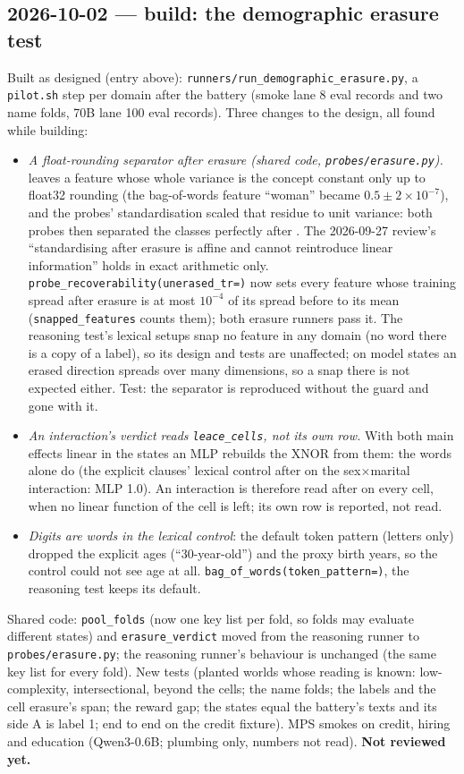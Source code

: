 \documentclass{article}
\begin{document}
\subsection*{2026-10-02 --- build: the demographic erasure test}
Built as designed (entry above): \texttt{runners/run\_demographic\_erasure.py}, a \texttt{pilot.sh} step per domain
after the battery (smoke lane 8 eval records and two name folds, 70B lane 100 eval records). Three changes to the
design, all found while building:
\begin{itemize}
  \item \emph{A float-rounding separator after erasure (shared code, \texttt{probes/erasure.py}).} \leace{} leaves a
        feature whose whole variance is the concept constant only up to float32 rounding (the bag-of-words feature
        ``woman'' became $0.5\pm2\times10^{-7}$), and the probes' standardisation scaled that residue to unit variance:
        both probes then separated the classes perfectly after \leace{}. The 2026-09-27 review's ``standardising after
        erasure is affine and cannot reintroduce linear information'' holds in exact arithmetic only.
        \texttt{probe\_recoverability(unerased\_tr=)} now sets every feature whose training spread after erasure is at
        most $10^{-4}$ of its spread before to its mean (\texttt{snapped\_features} counts them); both erasure runners
        pass it. The reasoning test's lexical setups snap no feature in any domain (no word there is a copy of a
        label), so its design and tests are unaffected; on model states an erased direction spreads over many
        dimensions, so a snap there is not expected either. Test: the separator is reproduced without the guard and
        gone with it.
  \item \emph{An interaction's verdict reads \texttt{leace\_cells}, not its own \leace{} row.} With both main effects
        linear in the states an MLP rebuilds the XNOR from them: the words alone do (the explicit clauses' lexical
        control after \leace{} on the sex$\times$marital interaction: MLP 1.0). An interaction is therefore read after
        \leace{} on every cell, when no linear function of the cell is left; its own \leace{} row is reported, not read.
  \item \emph{Digits are words in the lexical control}: the default token pattern (letters only) dropped the explicit
        ages (``30-year-old'') and the proxy birth years, so the control could not see age at all.
        \texttt{bag\_of\_words(token\_pattern=)}, the reasoning test keeps its default.
\end{itemize}
Shared code: \texttt{pool\_folds} (now one key list per fold, so folds may evaluate different states) and
\texttt{erasure\_verdict} moved from the reasoning runner to \texttt{probes/erasure.py}; the reasoning runner's
behaviour is unchanged (the same key list for every fold). New tests (planted worlds whose reading is known:
low-complexity, intersectional, beyond the cells; the name folds; the labels and the cell erasure's span; the reward
gap; the states equal the battery's texts and its side A is label 1; end to end on the credit fixture). MPS smokes on
credit, hiring and education (Qwen3-0.6B; plumbing only, numbers not read). \textbf{Not reviewed yet.}
\end{document}
